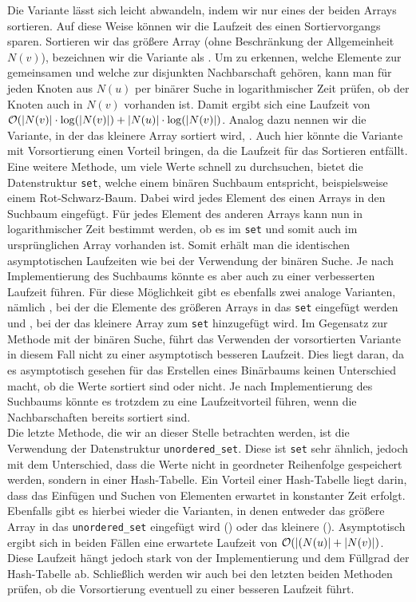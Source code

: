 Die Variante \SorSor{} lässt sich leicht abwandeln, indem wir nur eines der beiden Arrays sortieren.
Auf diese Weise können wir die Laufzeit des einen Sortiervorgangs sparen. Sortieren
wir das größere Array (ohne Beschränkung der Allgemeinheit $N(v)$), bezeichnen wir die Variante als \SorSea{}. Um zu erkennen, 
welche Elemente zur gemeinsamen und welche zur disjunkten Nachbarschaft gehören, kann man für jeden
Knoten aus $N(u)$ per binärer Suche in logarithmischer Zeit prüfen, ob der Knoten auch in $N(v)$ vorhanden ist.
Damit ergibt sich eine Laufzeit von $\mathcal{O}(|N(v)| \cdot \log(|N(v)|) + |N(u)| \cdot \log(|N(v)|)$. Analog dazu
nennen wir die Variante, in der das kleinere Array sortiert wird, \SeaSor. 
Auch hier könnte die Variante mit Vorsortierung einen Vorteil bringen, da die Laufzeit
für das Sortieren entfällt.
\\

Eine weitere Methode, um viele Werte schnell zu durchsuchen, bietet die Datenstruktur \texttt{set}, welche
einem binären Suchbaum entspricht, beispielsweise einem Rot-Schwarz-Baum.
Dabei wird jedes Element des einen Arrays in den Suchbaum eingefügt. 
Für jedes Element des anderen Arrays kann nun in logarithmischer
Zeit bestimmt werden, ob es im \texttt{set} und somit auch im ursprünglichen Array vorhanden ist.
Somit erhält man die identischen asymptotischen Laufzeiten wie bei der Verwendung der
binären Suche. Je nach Implementierung des Suchbaums könnte es aber auch zu einer verbesserten
Laufzeit führen. 
Für diese Möglichkeit gibt es ebenfalls zwei 
analoge Varianten, nämlich \SetSea, bei der die Elemente des größeren Arrays in das \texttt{set} eingefügt werden
und \SeaSet, bei der das kleinere Array zum \texttt{set} hinzugefügt wird.
Im Gegensatz zur Methode mit der binären Suche, führt das Verwenden der vorsortierten Variante in diesem Fall
nicht zu einer asymptotisch besseren Laufzeit. Dies liegt daran, da es asymptotisch
gesehen für das Erstellen eines Binärbaums keinen Unterschied macht, ob die Werte sortiert sind oder nicht.
Je nach Implementierung des Suchbaums könnte es trotzdem zu eine Laufzeitvorteil führen, 
wenn die Nachbarschaften bereits sortiert sind.
\\

Die letzte Methode, die wir an dieser Stelle betrachten werden,
ist die Verwendung der Datenstruktur \texttt{unordered\_set}. Diese ist \texttt{set} sehr ähnlich, jedoch mit
dem Unterschied, dass die Werte nicht in geordneter Reihenfolge gespeichert werden, sondern
in einer Hash-Tabelle. Ein Vorteil einer Hash-Tabelle liegt darin, 
dass das Einfügen und Suchen von Elementen
erwartet in konstanter Zeit erfolgt.
Ebenfalls gibt es hierbei wieder die Varianten, 
in denen entweder das größere Array in das \texttt{unordered\_set} eingefügt wird (\USetSea) 
oder das kleinere (\SeaUSet).{}
Asymptotisch ergibt sich in beiden Fällen eine erwartete Laufzeit von $\mathcal{O}(|(N(u)| + |N(v)|)$.
Diese Laufzeit hängt jedoch stark von der Implementierung und dem Füllgrad  der Hash-Tabelle ab. 
Schließlich werden wir auch bei den letzten beiden Methoden prüfen,
 ob die Vorsortierung eventuell zu einer besseren Laufzeit führt.
\\

